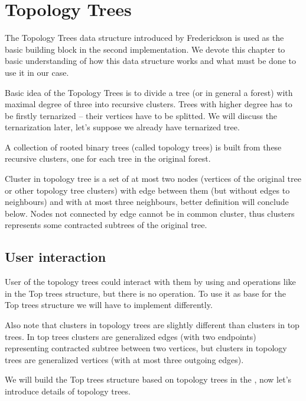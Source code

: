 \chapter{Topology Trees}
\label{chap:TopologyTrees}

The Topology Trees data structure introduced by Frederickson
\cite{DSforDynamicallyMaintainingRootedTrees} is used as the basic building
block in the second implementation. We devote this chapter to basic
understanding of how this data structure works and what must be done to use
it in our case.

Basic idea of the Topology Trees is to divide a tree (or in general a forest)
with maximal degree of three into recursive {\I clusters}. Trees with higher
degree has to be firstly {\I ternarized} -- their vertices have to be splitted.
We will discuss the ternarization later, let's suppose we already have
ternarized tree.

A collection of rooted binary trees (called {\I topology trees}) is built from
these recursive clusters, one for each tree in the original forest.

Cluster in topology tree is a set of at most two nodes (vertices of the
original tree or other topology tree clusters) with edge between them (but
without edges to neighbours) and with at most three neighbours, better
definition will conclude below. Nodes not connected by edge cannot be in common
cluster, thus clusters represents some contracted subtrees of the original tree.

\section{User interaction}

User of the topology trees could interact with them by using \Cut{} and \Link{}
operations like in the Top trees structure, but there is no \Expose{} operation.
To use it as base for the Top trees structure we will have to implement
\Expose{} differently.

Also note that clusters in topology trees are slightly different than clusters
in top trees. In top trees clusters are generalized edges (with two endpoints)
representing contracted subtree between two vertices, but clusters in topology
trees are generalized vertices (with at most three outgoing edges).

We will build the Top trees structure based on topology trees in
the , now let's introduce details of topology
trees.

